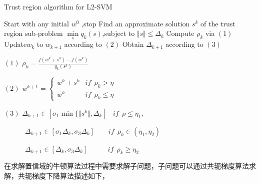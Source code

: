 \documentclass[master]{njuthesis}
\begin{document}
    \begin{algorithm}
    \caption{Trust region algorithm for L2-SVM}\label{TRON}
    \begin{algorithmic}[1]
      \State Start with any initial $w^0$
         ,stop
           \State Find an approximate solution $s^k$ of the trust region sub-problem
           \State $\min\limits_{s} q_k\left(s\right)$,subject to $\Vert s \Vert \le \Delta_k$
           \State Compute $\rho_k$ via $\left(1\right)$
           \State Update$w_k$ to $w_{k+1}$ according to $\left(2\right)$
           \State Obtain $\Delta_{k+1}$ according to $\left(3\right)$
         \EndIf
       \EndFor
    \EndProcedure
    \end{algorithmic}
    \end{algorithm}
  
    $\left(1\right)$  $\rho_k = \frac{f\left(w^k + s^k\right)-f\left(w^k\right)}{q_k\left(s^k\right)}$
   
    $\left(2\right)$  $w^{k+1} =  \begin{cases} 
      w^k+s^k & if~~\rho_k > \eta \\
      w^k & if~~ \rho_k \le \eta
   \end{cases}$

    $\left(3\right)$ $\Delta_{k+1} \in [\sigma_1\min\{\Vert s^k \Vert,\Delta_k]~~~~if~~ \rho \le \eta_1,$

    ~~~~~~$\Delta_{k+1} \in [\sigma_1\Delta_k,\sigma_3\Delta_k]~~~~~~~~~if~~\rho_k \in \left(\eta_1,\eta_2\right)$

    ~~~~~~$\Delta_{k+1} \in [\Delta_k,\sigma_3\Delta_k]~~~~~~~~~~~~~if~~\rho_k \ge \eta_2$
    
    在求解置信域的牛顿算法过程中需要求解子问题，子问题可以通过共轭梯度算法求解，共轭梯度下降算法描述如下，
    
\end{document}
